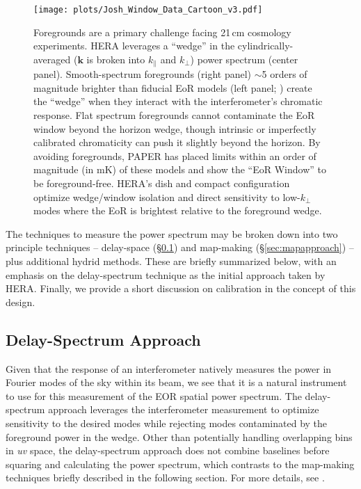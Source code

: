 \documentclass[preprint,11pt]{aastex}
\begin{document}
\begin{figure}[t]
	\centering
	\texttt{[image: plots/Josh\_Window\_Data\_Cartoon\_v3.pdf]}
	\vspace{-10pt}
	\caption{Foregrounds are a primary challenge facing 21\,cm cosmology experiments. 
HERA leverages a ``wedge'' in the cylindrically-averaged ($\mathbf{k}$ is broken into $k_\|$ and $k_\perp$) power spectrum (center panel). Smooth-spectrum foregrounds (right panel) $\sim$5 orders of magnitude brighter than fiducial EoR models (left panel; \citealt{mesinger_et_al2011}) create the ``wedge'' when they interact with the interferometer's chromatic response. Flat spectrum foregrounds cannot contaminate the EoR window beyond the horizon wedge, though intrinsic or imperfectly calibrated chromaticity can push it slightly beyond the horizon. By avoiding foregrounds, PAPER has placed limits within an order
of magnitude (in mK) of these models \citep{ali_et_al2015} and show the ``EoR Window'' to be foreground-free.
HERA's dish and compact configuration optimize wedge/window isolation and direct sensitivity to low-$k_\perp$ modes where the EoR is brightest relative to the foreground wedge.
}	\label{fig:wedge}
\end{figure}


The techniques to measure the power spectrum may be broken down into two principle techniques -- delay-space (\S\ref{sec:delayapproach}) and map-making (\S\ref{sec:mapapproach}) -- plus additional hydrid methods.  These are briefly summarized below, with an emphasis on the delay-spectrum technique as the initial approach taken by HERA.  Finally, we provide a short discussion on calibration in the concept of this design.

\subsection{Delay-Spectrum Approach}
\label{sec:delayapproach}
Given that the response of an interferometer natively measures the power in Fourier modes of the sky within its beam, we see that it is a natural instrument to use for this measurement of the EOR spatial power spectrum.  The delay-spectrum approach leverages the interferometer measurement to optimize sensitivity to the desired modes while rejecting modes contaminated by the foreground power in the wedge.  Other than potentially handling overlapping bins in {\em uv} space, the delay-spectrum approach does not combine baselines before squaring and calculating the power spectrum, which contrasts to the map-making techniques briefly described in the following section.  For more details, see \cite{parsons_et_al2012b}.
\end{document}
